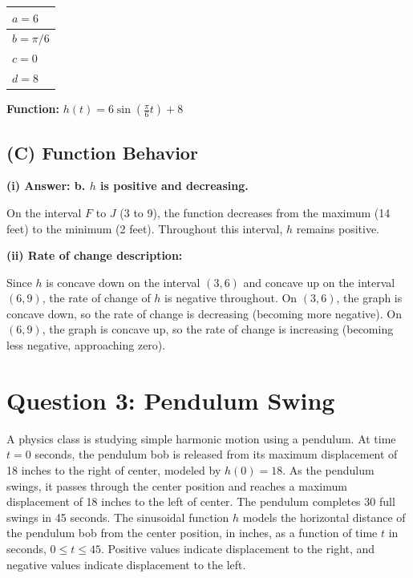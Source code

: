 \documentclass[11pt]{article}
\begin{document}
\begin{center}
\begin{tabular}{|l|}
\hline
$a = 6$ \\[10pt]
\hline
$b = \pi/6$ \\[10pt]
\hline
$c = 0$ \\[10pt]
\hline
$d = 8$ \\[10pt]
\hline
\end{tabular}
\end{center}

\textbf{Function:} $\displaystyle h(t) = 6 \sin\left(\frac{\pi}{6} t\right) + 8$

\subsection*{(C) Function Behavior}

\textbf{(i) Answer: b. $h$ is positive and decreasing.}

On the interval $F$ to $J$ (3 to 9), the function decreases from the maximum (14 feet) to the minimum (2 feet). Throughout this interval, $h$ remains positive.

\vspace{0.5cm}
\textbf{(ii) Rate of change description:}

Since $h$ is concave down on the interval $(3, 6)$ and concave up on the interval $(6, 9)$, the rate of change of $h$ is negative throughout. On $(3, 6)$, the graph is concave down, so the rate of change is decreasing (becoming more negative). On $(6, 9)$, the graph is concave up, so the rate of change is increasing (becoming less negative, approaching zero).

\newpage

\section*{Question 3: Pendulum Swing}

A physics class is studying simple harmonic motion using a pendulum. At time $t = 0$ seconds, the pendulum bob is released from its maximum displacement of 18 inches to the right of center, modeled by $h(0) = 18$. As the pendulum swings, it passes through the center position and reaches a maximum displacement of 18 inches to the left of center. The pendulum completes 30 full swings in 45 seconds. The sinusoidal function $h$ models the horizontal distance of the pendulum bob from the center position, in inches, as a function of time $t$ in seconds, $0 \leq t \leq 45$. Positive values indicate displacement to the right, and negative values indicate displacement to the left.
\end{document}
